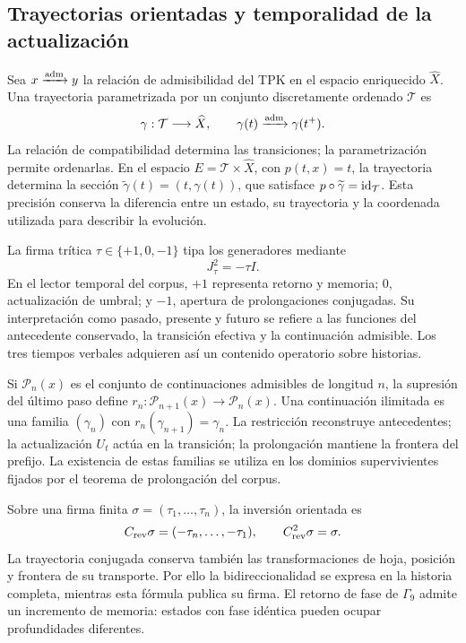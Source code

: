 \documentclass[a4paper,10pt]{article}
\theoremstyle{definition}\newtheorem{definition}[theorem]{Definición}
\theoremstyle{remark}\newtheorem{remark}[theorem]{Observación}
\numberwithin{equation}{section}
\begin{document}
\subsection{Trayectorias orientadas y temporalidad de la actualización}

Sea \(x\xrightarrow{\rm adm}y\) la relación de admisibilidad del TPK en
el espacio enriquecido \(\widehat X\). Una trayectoria parametrizada por
un conjunto discretamente ordenado \(\mathcal T\) es
\[
 \gamma:\mathcal T\longrightarrow\widehat X,
 \qquad\gamma(t)\xrightarrow{\rm adm}\gamma(t^+).
\]
La relación de compatibilidad determina las transiciones; la parametrización
permite ordenarlas. En el espacio \(E=\mathcal T\times\widehat X\),
con \(p(t,x)=t\), la trayectoria determina la sección
\(\widetilde\gamma(t)=(t,\gamma(t))\), que satisface
\(p\circ\widetilde\gamma=\operatorname{id}_{\mathcal T}\).
Esta precisión conserva la diferencia entre un estado, su trayectoria y
la coordenada utilizada para describir la evolución.

La firma trítica \(\tau\in\{+1,0,-1\}\) tipa los generadores mediante
\[
 J_\tau^2=-\tau I.
\]
En el lector temporal del corpus, \(+1\) representa retorno y memoria;
\(0\), actualización de umbral; y \(-1\), apertura de prolongaciones
conjugadas. Su interpretación como pasado, presente y futuro se refiere
a las funciones del antecedente conservado, la transición efectiva y la
continuación admisible. Los tres tiempos verbales adquieren así un
contenido operatorio sobre historias.

Si \(\mathcal P_n(x)\) es el conjunto de continuaciones admisibles de
longitud \(n\), la supresión del último paso define
\(r_n:\mathcal P_{n+1}(x)\to\mathcal P_n(x)\). Una continuación
ilimitada es una familia \((\gamma_n)\) con
\(r_n(\gamma_{n+1})=\gamma_n\). La restricción reconstruye antecedentes;
la actualización \(U_t\) actúa en la transición; la prolongación mantiene
la frontera del prefijo. La existencia de estas familias se utiliza en
los dominios supervivientes fijados por el teorema de prolongación del
corpus.

Sobre una firma finita \(\sigma=(\tau_1,\ldots,\tau_n)\), la inversión
orientada es
\[
 C_{\rm rev}\sigma=(-\tau_n,\ldots,-\tau_1),
 \qquad C_{\rm rev}^2\sigma=\sigma.
\]
La trayectoria conjugada conserva también las transformaciones de hoja,
posición y frontera de su transporte. Por ello la bidireccionalidad se
expresa en la historia completa, mientras esta fórmula publica su firma.
El retorno de fase de \(\Gamma_9\) admite un incremento de memoria:
estados con fase idéntica pueden ocupar profundidades diferentes.
\end{document}
